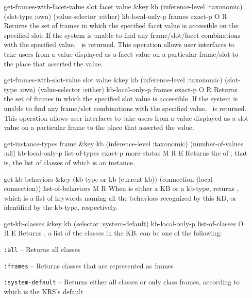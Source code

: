 \begin{okbcop}{get-frames-with-facet-value}{ slot facet value \&key kb (inference-level :taxonomic) (slot-type :own) (value-selector :either) kb-local-only-p} { frames exact-p } { O } { R } {  }
Returns the set of frames in which the specified facet value is accessible
   on the specified slot.
   If the system is unable to find any frame/slot/facet combinations with the
   specified value, \emptylist\ is returned.
   This operation allows user interfaces to take users from a value
   displayed as a facet value on a particular frame/slot to the place
   that asserted the value.
\end{okbcop}

\begin{okbcop}{get-frames-with-slot-value}{ slot value \&key kb (inference-level :taxonomic) (slot-type :own) (value-selector :either) kb-local-only-p} { frames exact-p } { O } { R } {  }
Returns the set of frames in which the specified slot value is accessible.
   If the system is unable to find any frame/slot combinations with the
   specified value, \emptylist\ is returned.
   This operation allows user interfaces to take users from a value
   displayed as a slot value on a particular frame to the place that
   asserted the value.
\end{okbcop}

\begin{okbcop}{get-instance-types}{ frame \&key kb (inference-level :taxonomic) (number-of-values :all) kb-local-only-p} { list-of-types exact-p more-status } { M } { R } { E }
Returns the  of , that is, the list of 
   classes of which  is an instance.
\end{okbcop}

\begin{okbcop}{get-kb-behaviors}{ \&key (kb-type-or-kb (current-kb)) (connection (local-connection))} { list-of-behaviors } { M } { R } {  }
When  is either a KB or a kb-type, returns
   , which is a list of keywords naming all
   the behaviors recognized by this KB, or identified by the kb-type,
   respectively.
\end{okbcop}

\begin{okbcop}{get-kb-classes}{ \&key kb (selector :system-default) kb-local-only-p} { list-of-classes } { O } { R } { E }
Returns , a list of the classes in the KB.
    can be one of the following:
   \bitem
   \item {\tt :all} -- Returns all classes
   \item {\tt :frames} -- Returns classes that are represented as frames
   \item {\tt :system-default} -- Returns either all classes or
          only class frames, according to which is the KRS's default
   \eitem
\end{okbcop}

